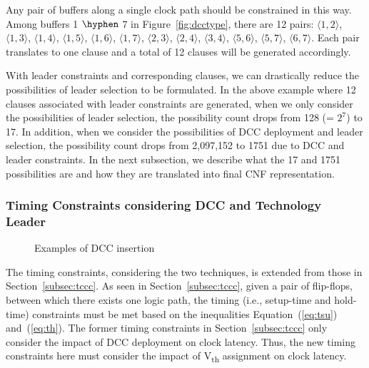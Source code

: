 Any pair of buffers along a single clock path should be constrained in this way. Among buffers 1 $\hyphen$ 7 in Figure~\ref{fig:dcctype}, there are 12 pairs: $\langle1, 2\rangle$, $\langle1, 3\rangle$, $\langle1, 4\rangle$, $\langle1, 5\rangle$, $\langle1, 6\rangle$, $\langle1, 7\rangle$, $\langle2, 3\rangle$, $\langle2, 4\rangle$, $\langle3, 4\rangle$, $\langle5, 6\rangle$, $\langle5, 7\rangle$, $\langle6, 7\rangle$. Each pair translates to one clause and a total of 12 clauses will be generated accordingly.

With leader constraints and corresponding clauses, we can drastically reduce the possibilities of leader selection to be formulated. In the above example where 12 clauses associated with leader constraints are generated, when we only consider the possibilities of leader selection, the possibility count drops from 128 (= $2^7$) to 17. In addition, when we consider the possibilities of DCC deployment and leader selection, the possibility count drops from 2,097,152 to 1751 due to DCC and leader constraints. In the next subsection, we describe what the 17 and 1751 possibilities are and how they are translated into final CNF representation.

\subsubsection{Timing Constraints considering DCC and Technology Leader}
\label{sec:TVA:timingconstraint}
\begin{figure*}
    \centering
    \hspace{1cm}
    \caption{Examples of DCC insertion}
    \label{fig:dccleaderinsert}
\end{figure*}
The timing constraints, considering the two techniques, is extended from those in Section~\ref{subsec:tccc}. As seen in Section~\ref{subsec:tccc}, given a pair of flip-flops, between which there exists one logic path, the timing (i.e., setup-time and hold-time) constraints must be met based on the inequalities Equation~(\ref{eq:tsu}) and~(\ref{eq:th}). The former timing constraints in Section~\ref{subsec:tccc} only consider the impact of DCC deployment on clock latency. Thus, the new timing constraints here must consider the impact of V\textsubscript{th} assignment on clock latency. 

